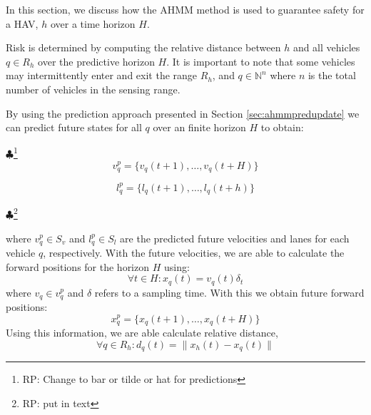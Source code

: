 \documentclass[letterpaper, 10 pt, conference]{ieeeconf}  %
\newcommand\NB[1]{$\spadesuit$\footnote{NB: #1}}
\newcommand\RP[1]{$\clubsuit$\footnote{RP: #1}}
\begin{document}
 In this section, we discuss how the AHMM method is used to guarantee safety for a HAV, $h$ over a time horizon $H$. 
 
 
 Risk is determined by computing the relative distance between $h$ and all vehicles $q\in R_h$ over the predictive horizon $H$. It is important to note that some vehicles may intermittently enter and exit the range $R_h$, and $q\in\mathbb{N}^n$
where $n$ is the total number of vehicles in the sensing range.


By using the prediction approach presented in Section \ref{sec:ahmmpredupdate} we can predict future states for all $q$ over an finite horizon $H$ to obtain:

\RP{Change to bar or tilde or hat for predictions}
\begin{equation}
    v_q^p = \{v_q(t+1),\ldots,v_q(t+H)\}
\end{equation}

\begin{equation}
    l_q^p = \{l_q(t+1),\ldots,l_q(t+h)\}
\end{equation}

\RP{put in text}

where $v_q^p\in S_v$ and $l_q^p\in S_l$ are the predicted future velocities and lanes for each vehicle $q$, respectively.
With the future velocities, we are able to calculate the forward positions for the horizon $H$ using:
\begin{equation} \label{eq:dumpos}
    \forall{t}\in H: x_q(t) = v_q(t)\delta_t
\end{equation}
where $v_q\in v_q^p$ and $\delta$ refers to a sampling time. With this we obtain future forward positions:
\begin{equation}
    x_q^p = \{x_q(t+1),\ldots,x_q(t+H)\}
\end{equation}
Using this information, we are able calculate relative distance,
\begin{equation}
    \forall q \in R_h: d_q(t) = \lVert x_h(t)-x_q(t)\rVert
\end{equation}
\end{document}
